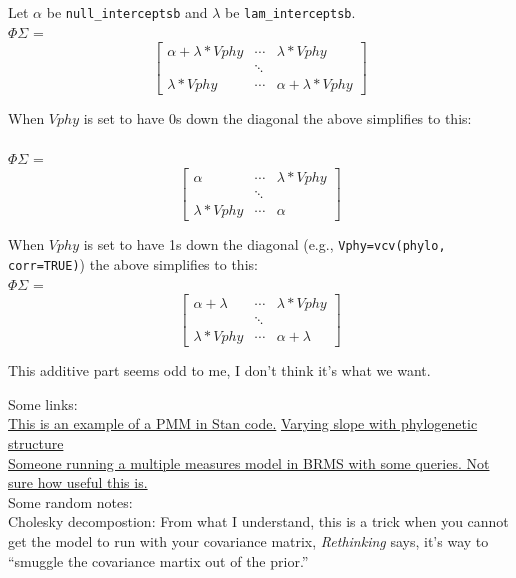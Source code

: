 \documentclass[11pt,letter]{article}
\begin{document}
Let $\alpha$ be  \verb|null_interceptsb| and $\lambda$ be \verb|lam_interceptsb|.\\

$\Phi\Sigma$ = 
\begin{equation}
 \begin{bmatrix}
  \alpha+\lambda*Vphy &  \cdots & \lambda*Vphy \\
   & \ddots \\
  \lambda*Vphy & \cdots &   \alpha+\lambda*Vphy
 \end{bmatrix}
\end{equation}

\vspace{2ex}
When $Vphy$ is set to have 0s down the diagonal the above simplifies to this:\\
\\

$\Phi\Sigma$ = 
\begin{equation}
 \begin{bmatrix}
  \alpha &  \cdots & \lambda*Vphy \\
   & \ddots \\
  \lambda*Vphy & \cdots &   \alpha
 \end{bmatrix}
\end{equation}

\vspace{2ex}
When $Vphy$ is set to have 1s down the diagonal (e.g., \verb|Vphy=vcv(phylo, corr=TRUE)|) the above simplifies to this:\\

$\Phi\Sigma$ = 
\begin{equation}
 \begin{bmatrix}
  \alpha+\lambda &  \cdots & \lambda*Vphy \\
   & \ddots \\
  \lambda*Vphy & \cdots &   \alpha+\lambda
 \end{bmatrix}
\end{equation}

\vspace{2ex}
This additive part seems odd to me, I don't think it's what we want.


\clearpage
Some links:\\
\href{https://groups.google.com/forum/#!topic/stan-users/Irv9RWDCpQE}{This is an example of a PMM in Stan code.}
\href{https://discourse.mc-stan.org/t/varying-slope-with-phylogenetic-structure/5739/4}{Varying slope with phylogenetic structure}\\
\href{https://discourse.mc-stan.org/t/multivariate-phylogenetic-with-repeated-measurements-model-help/14359/6}{Someone running a multiple measures model in BRMS with some queries. Not sure how useful this is.}\\

Some random notes:\\
Cholesky decompostion: From what I understand, this is a trick when you cannot get the model to run with your covariance matrix, \emph{Rethinking} says, it's way to ``smuggle the covariance martix out of the prior.''
\end{document}
